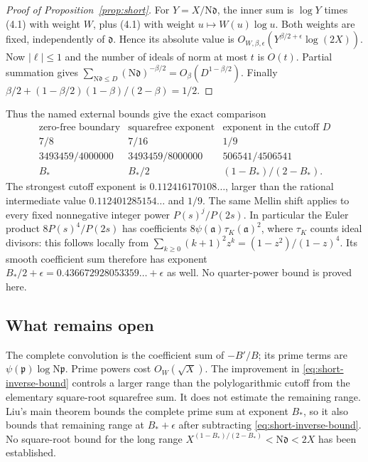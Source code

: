 \documentclass[11pt]{article}
\newcommand{\N}{\mathrm N}
\begin{document}
\begin{proof}[Proof of Proposition~\ref{prop:short}]
For $Y=X/\N\mathfrak d$, the inner sum is
$\log Y$ times (4.1) with weight $W$, plus (4.1) with
weight $u\mapsto W(u)\log u$. Both weights are fixed, independently
of $\mathfrak d$. Hence its absolute value is
$O_{W,\beta,\epsilon}(Y^{\beta/2+\epsilon}\log(2X))$.
Now $|\ell|\le1$ and the number of ideals of norm at most $t$
is $O(t)$. Partial summation gives
$\sum_{\N\mathfrak d\le D}(\N\mathfrak d)^{-\beta/2}
=O_\beta(D^{1-\beta/2})$.
Finally $\beta/2+(1-\beta/2)(1-\beta)/(2-\beta)=1/2$.
\end{proof}

Thus the named external bounds give the exact comparison
\[
\begin{array}{c|c|c}
 \text{zero-free boundary}&
 \text{squarefree exponent}&\text{exponent in the cutoff }D\\ \hline
 7/8&7/16&1/9\\
 3493459/4000000&3493459/8000000&506541/4506541\\
 B_*&B_*/2&(1-B_*)/(2-B_*) .
\end{array}
\]
The strongest cutoff exponent is $0.112416170108\ldots$, larger than
the rational intermediate value $0.112401285154\ldots$ and $1/9$. The same Mellin shift applies to every fixed nonnegative integer power
$P(s)^j/P(2s)$. In particular the Euler product
$8P(s)^4/P(2s)$ has coefficients
$8\psi(\mathfrak a)\tau_K(\mathfrak a)^2$, where $\tau_K$ counts
ideal divisors: this follows locally from
$\sum_{k\ge0}(k+1)^2z^k=(1-z^2)/(1-z)^4$.
Its smooth coefficient sum therefore has exponent
$B_*/2+\epsilon=0.436672928053359\ldots+\epsilon$ as well. No quarter-power bound
is proved here.

\subsection*{What remains open}
The complete convolution is the coefficient sum of $-B'/B$;
its prime terms are $\psi(\mathfrak p)\log\N\mathfrak p$.
Prime powers cost $O_W(\sqrt X)$.
The improvement in \eqref{eq:short-inverse-bound} controls a larger range than the
polylogarithmic cutoff from the elementary square-root
squarefree sum. It does not estimate the remaining range.
Liu's main theorem bounds the complete prime sum
at exponent $B_*$, so it also bounds that remaining range at
$B_*+\epsilon$ after subtracting \eqref{eq:short-inverse-bound}. No square-root
bound for the long range
$X^{(1-B_*)/(2-B_*)}<\N\mathfrak d<2X$ has been established.
\end{document}
